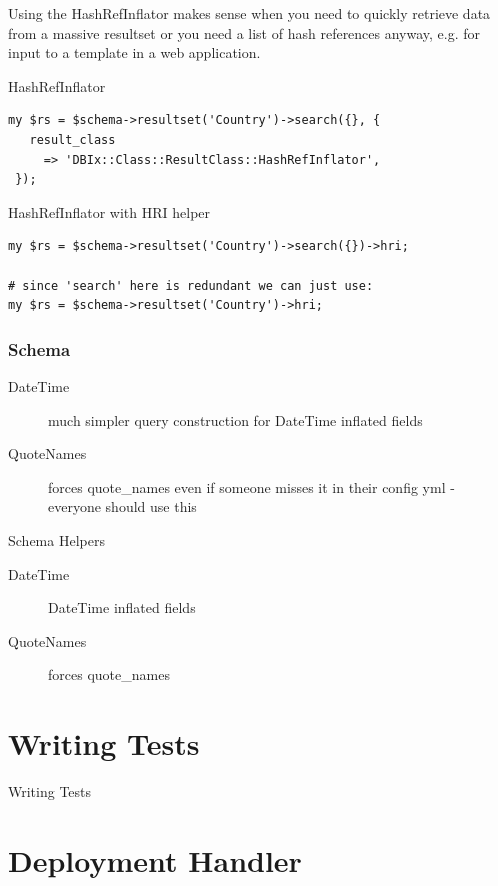 Using the HashRefInflator makes sense when you need to quickly retrieve
data from a massive resultset or you need a list of hash references anyway,
e.g. for input to a template in a web application.

\begin{frame}[fragile]{HashRefInflator}
\begin{lstlisting}
my $rs = $schema->resultset('Country')->search({}, {
   result_class
     => 'DBIx::Class::ResultClass::HashRefInflator',
 });
\end{lstlisting}
\end{frame}

\begin{frame}[fragile]{HashRefInflator with HRI helper}
\begin{lstlisting}
my $rs = $schema->resultset('Country')->search({})->hri;

# since 'search' here is redundant we can just use:
my $rs = $schema->resultset('Country')->hri;
\end{lstlisting}
\end{frame}

\subsubsection{Schema}
\begin{description}
\item[DateTime]
much simpler query construction for DateTime inflated fields
\item[QuoteNames] 
forces quote\_names even if someone misses it in their 
config yml - everyone should use this
\end{description}

\begin{frame}{Schema Helpers}
\begin{description}
\item[DateTime] DateTime inflated fields
\item[QuoteNames] forces quote\_names
\end{description}
\end{frame}

\section{Writing Tests}
\begin{frame}{Writing Tests}
\end{frame}

\section{Deployment Handler}

